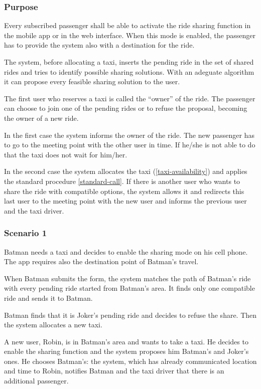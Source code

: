 \label{ride-sharing}
\subsubsection{Purpose}

Every subscribed passenger shall be able to activate the ride sharing function in the mobile app or in the web interface. When this mode is enabled, the passenger has to provide the system also with a destination for the ride.

The system, before allocating a taxi, inserts the pending ride in the set of shared rides and tries to identify possible sharing solutions.
With an adeguate algorithm it can propose every feasible sharing solution to the user.

The first user who reserves a taxi is called the ``owner'' of the ride.
The passenger can choose to join one of the pending rides or to refuse the proposal, becoming the owner of a new ride.

In the first case the system informs the owner of the ride. The new passenger has to go to the meeting point with the other user in time. If he/she is not able to do that the taxi does not wait for him/her.

In the second case the system allocates the taxi (\ref{taxi-availability}) and applies the standard procedure \ref{standard-call}. If there is another user who wants to share the ride with compatible options, the system allows it and redirects this last user to the meeting point with the new user and informs the previous user and the taxi driver.

\subsubsection{Scenario 1}
Batman needs a taxi and decides to enable the sharing mode on his cell phone. The app requires also the destination point of Batman's travel.
 
When Batman submits the form, the system matches the path of Batman's ride with every pending ride started from Batman's area. It finds only one compatible ride and sends it to Batman.
 
 Batman finds that it is Joker's pending ride and decides to refuse the share. Then the system allocates a new taxi.
 
 A new user, Robin, is in Batman's area and wants to take a taxi. He decides to enable the sharing function and the system proposes him Batman's and Joker's ones. He chooses Batman's: the system, which has already communicated location and time to Robin, notifies Batman and the taxi driver that there is an additional passenger.
 
